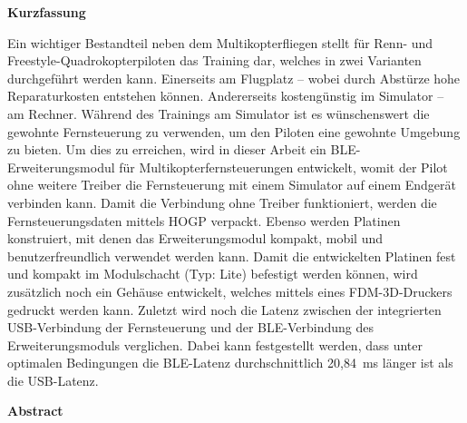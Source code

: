 
\pagestyle{empty}

\newenvironment{abstractpage}
  {\cleardoublepage\vspace*{\fill}\thispagestyle{empty}}
  {\vfill\cleardoublepage}
\newenvironment{abstractsection}[1]
  {\bigskip
   \begin{center}\bfseries#1\end{center}}
  {\par\bigskip}

\begin{abstractpage}
    \begin{abstractsection}{Kurzfassung}
      Ein wichtiger Bestandteil neben dem Multikopterfliegen stellt für Renn- und Freestyle-Quadro\-kopterpiloten das Training dar, welches in zwei Varianten durchgeführt werden kann. Einerseits am Flugplatz -- wobei durch Abstürze hohe Reparaturkosten entstehen können. Andererseits kostengünstig im Simulator -- am Rechner. Während des Trainings am Simulator ist es wünschenswert die gewohnte Fernsteuerung zu verwenden, um den Piloten eine gewohnte Umgebung zu bieten. Um dies zu erreichen, wird in dieser Arbeit ein \acs{BLE}-Erweiterungsmodul für Multikopterfernsteuerungen entwickelt, womit der Pilot ohne weitere Treiber die Fernsteuerung mit einem Simulator auf einem Endgerät verbinden kann. Damit die Verbindung ohne Treiber funktioniert, werden die Fernsteuerungsdaten mittels \acs{HOGP} verpackt. Ebenso werden Platinen konstruiert, mit denen das Erweiterungsmodul kompakt, mobil und benutzerfreundlich verwendet werden kann. Damit die entwickelten Platinen fest und kompakt im Modulschacht (Typ: Lite) befestigt werden können, wird zusätzlich noch ein Gehäuse entwickelt, welches mittels eines \acs{FDM}-3D-Druckers gedruckt werden kann. Zuletzt wird noch die Latenz zwischen der integrierten USB-Verbindung der Fernsteuerung und der \acs{BLE}-Verbindung des Erweiterungsmoduls verglichen. Dabei kann festgestellt werden, dass unter optimalen Bedingungen die \acs{BLE}-Latenz durchschnittlich 20,84~ms länger ist als die USB-Latenz. 
    \end{abstractsection}

    \begin{abstractsection}{Abstract}
    \end{abstractsection}
\end{abstractpage}